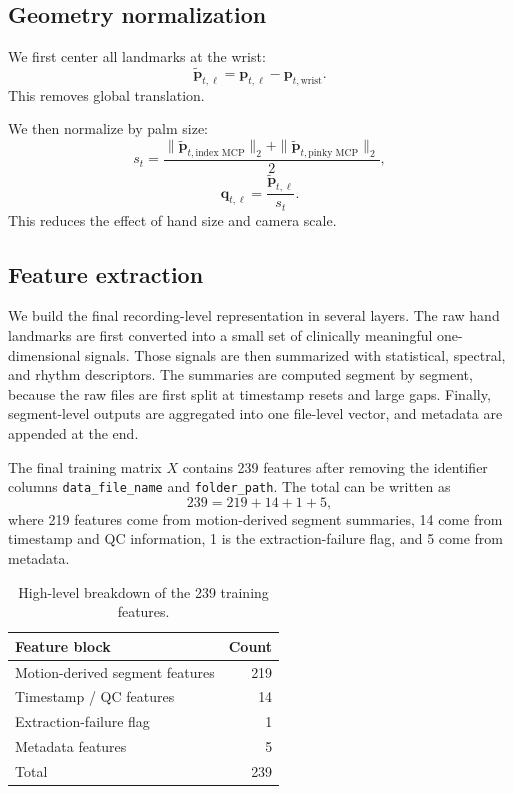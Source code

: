 \documentclass[10pt,twocolumn]{article}
\begin{document}
\subsection{Geometry normalization}
We first center all landmarks at the wrist:
\begin{equation}
\tilde{\mathbf{p}}_{t,\ell} = \mathbf{p}_{t,\ell} - \mathbf{p}_{t,\text{wrist}}.
\end{equation}
This removes global translation.

We then normalize by palm size:
\begin{equation}
 s_t = \frac{\|\tilde{\mathbf{p}}_{t,\text{index MCP}}\|_2 + \|\tilde{\mathbf{p}}_{t,\text{pinky MCP}}\|_2}{2},
\end{equation}
\begin{equation}
\mathbf{q}_{t,\ell} = \frac{\tilde{\mathbf{p}}_{t,\ell}}{s_t}.
\end{equation}
This reduces the effect of hand size and camera scale.

\subsection{Feature extraction}
We build the final recording-level representation in several layers. The raw hand landmarks are first converted into a small set of clinically meaningful one-dimensional signals. Those signals are then summarized with statistical, spectral, and rhythm descriptors. The summaries are computed segment by segment, because the raw files are first split at timestamp resets and large gaps. Finally, segment-level outputs are aggregated into one file-level vector, and metadata are appended at the end.

The final training matrix $X$ contains 239 features after removing the identifier columns \texttt{data\_file\_name} and \texttt{folder\_path}. The total can be written as
\begin{equation}
239 = 219 + 14 + 1 + 5,
\end{equation}
where 219 features come from motion-derived segment summaries, 14 come from timestamp and QC information, 1 is the extraction-failure flag, and 5 come from metadata.

\begin{table}[H]
\centering
\caption{High-level breakdown of the 239 training features.}
\label{tab:feature-breakdown-main}
\begin{tabular}{lr}
\toprule
Feature block & Count \\
\midrule
Motion-derived segment features & 219 \\
Timestamp / QC features & 14 \\
Extraction-failure flag & 1 \\
Metadata features & 5 \\
\midrule
Total & 239 \\
\bottomrule
\end{tabular}
\end{table}
\end{document}
